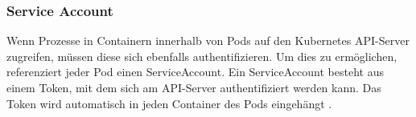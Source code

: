 \subsubsection{Service Account}
\label{subsec:kubernetes:serviceaccount}
Wenn Prozesse in Containern innerhalb von Pods auf den Kubernetes API-Server zugreifen, müssen diese sich ebenfalls authentifizieren.
Um dies zu ermöglichen, referenziert jeder Pod einen ServiceAccount. Ein ServiceAccount besteht aus einem Token, mit dem sich am
API-Server authentifiziert werden kann.
Das Token wird automatisch in jeden Container des Pods eingehängt \cite{kubernetesServiceAccounts}.


